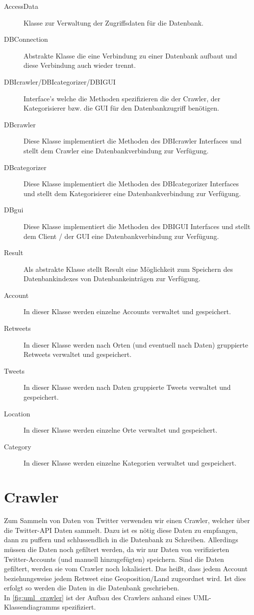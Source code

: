 \begin{description}
\item[AccessData] Klasse zur Verwaltung der Zugriffsdaten für die Datenbank.
\item[DBConnection] Abstrakte Klasse die eine Verbindung zu einer Datenbank aufbaut und diese Verbindung auch wieder trennt.
\item[DBIcrawler/DBIcategorizer/DBIGUI] Interface's welche die Methoden spezifizieren die der Crawler, der Kategorisierer bzw. die GUI für den Datenbankzugriff benötigen.
\item[DBcrawler] Diese Klasse implementiert die Methoden des DBIcrawler Interfaces und stellt dem Crawler eine Datenbankverbindung zur Verfügung.
\item[DBcategorizer] Diese Klasse implementiert die Methoden des DBIcategorizer Interfaces und stellt dem Kategorisierer eine Datenbankverbindung zur Verfügung.
\item[DBgui] Diese Klasse implementiert die Methoden des DBIGUI Interfaces und stellt dem Client / der GUI eine Datenbankverbindung zur Verfügung.
\item[Result] Als abstrakte Klasse stellt Result eine Möglichkeit zum Speichern des Datenbankindexes von Datenbankeinträgen zur Verfügung.
\item[Account] In dieser Klasse werden einzelne Accounts verwaltet und gespeichert.
\item[Retweets] In dieser Klasse werden nach Orten (und eventuell nach Daten) gruppierte Retweets verwaltet und gespeichert.
\item[Tweets] In dieser Klasse werden nach Daten gruppierte Tweets verwaltet und gespeichert.
\item[Location] In dieser Klasse werden einzelne Orte verwaltet und gespeichert.
\item[Category] In dieser Klasse werden einzelne Kategorien verwaltet und gespeichert.
\end{description}

\section{Crawler}
Zum Sammeln von Daten von Twitter verwenden wir einen Crawler, welcher über die Twitter-API Daten sammelt. Dazu ist es nötig diese Daten zu empfangen, dann zu puffern und schlussendlich in die Datenbank zu Schreiben. Allerdings müssen die Daten noch gefiltert werden, da wir nur Daten von verifizierten Twitter-Accounts (und manuell hinzugefügten) speichern. Sind die Daten gefiltert, werden sie vom Crawler noch lokalisiert. Das heißt, dass jedem Account beziehungsweise jedem Retweet eine Geoposition/Land zugeordnet wird. Ist dies erfolgt so werden die Daten in die Datenbank geschrieben.
\\ In \cref{fig:uml_crawler} ist der Aufbau des Crawlers anhand eines UML-Klassendiagramms spezifiziert.

